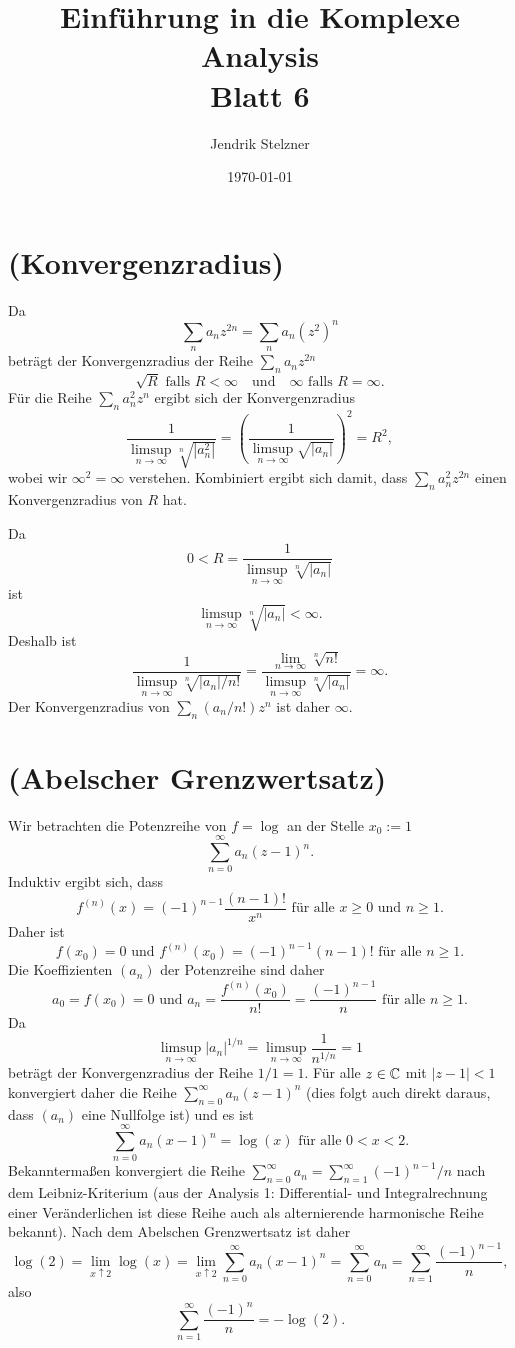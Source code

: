 \documentclass[a4paper,10pt]{article}
\title{\sc Einführung in die Komplexe Analysis \\ \Large Blatt 6}
\author{Jendrik Stelzner}
\date{\today}
\begin{document}
\maketitle





\section{(Konvergenzradius)}
Da
\[
 \sum_n a_n z^{2n}
 = \sum_n a_n \left(z^2\right)^n
\]
beträgt der Konvergenzradius der Reihe $\sum_n a_n z^{2n}$
\[
 \sqrt{R} \text{ falls } R < \infty \quad \text{und} \quad \infty \text{ falls } R = \infty.
\]
Für die Reihe $\sum_n a_n^2 z^n$ ergibt sich der Konvergenzradius
\[
 \frac{1}{\limsup_{n \to \infty} \sqrt[n]{|a_n^2|}}
 = \left( \frac{1}{\limsup_{n \to \infty} \sqrt{|a_n|}} \right)^2
 = R^2,
\]
wobei wir $\infty^2 = \infty$ verstehen. Kombiniert ergibt sich damit, dass $\sum_n a_n^2 z^{2n}$ einen Konvergenzradius von $R$ hat.

Da
\[
 0 < R = \frac{1}{\limsup_{n \to \infty} \sqrt[n]{|a_n|}}
\]
ist
\[
 \limsup_{n \to \infty} \sqrt[n]{|a_n|} < \infty.
\]
Deshalb ist
\[
 \frac{1}{\limsup_{n \to \infty} \sqrt[n]{|a_n|/n!}}
 = \frac{\lim_{n \to \infty} \sqrt[n]{n!}}{\limsup_{n \to \infty} \sqrt[n]{|a_n|}}
 = \infty.
\]
Der Konvergenzradius von $\sum_n (a_n/n!) z^n$ ist daher $\infty$.





\section{(Abelscher Grenzwertsatz)}
Wir betrachten die Potenzreihe von $f = \log$ an der Stelle $x_0 := 1$
\[
  \sum_{n=0}^\infty a_n (z-1)^n.
\]
Induktiv ergibt sich, dass
\[
 f^{(n)}(x) = (-1)^{n-1} \frac{(n-1)!}{x^n} \text{ für alle } x \geq 0 \text{ und } n \geq 1.
\]
Daher ist
\[
 f(x_0) = 0 \text{ und } f^{(n)}(x_0) = (-1)^{n-1}(n-1)! \text{ für alle } n \geq 1.
\]
Die Koeffizienten $(a_n)$ der Potenzreihe sind daher
\[
 a_0 = f(x_0) = 0 \text{ und } a_n = \frac{f^{(n)}(x_0)}{n!} = \frac{(-1)^{n-1}}{n} \text{ für alle } n \geq 1.
\]
Da
\[
 \limsup_{n \to \infty} |a_n|^{1/n} = \limsup_{n \to \infty} \frac{1}{n^{1/n}} = 1
\]
beträgt der Konvergenzradius der Reihe $1/1 = 1$. Für alle $z \in \mathbb{C}$ mit $|z-1| < 1$ konvergiert daher die Reihe $\sum_{n=0}^\infty a_n (z-1)^n$ (dies folgt auch direkt daraus, dass $(a_n)$ eine Nullfolge ist) und es ist
\[
 \sum_{n=0}^\infty a_n (x-1)^n = \log(x) \text{ für alle } 0 < x < 2.
\]
Bekanntermaßen konvergiert die Reihe $\sum_{n=0}^\infty a_n = \sum_{n=1}^\infty (-1)^{n-1}/n$ nach dem Leibniz-Kriterium (aus der Analysis 1: Differential- und Integralrechnung einer Veränderlichen ist diese Reihe auch als alternierende harmonische Reihe bekannt). Nach dem Abelschen Grenzwertsatz ist daher
\[
 \log(2)
 = \lim_{x \uparrow 2} \log(x)
 = \lim_{x \uparrow 2} \sum_{n=0}^\infty a_n (x-1)^n
 = \sum_{n=0}^\infty a_n
 = \sum_{n=1}^\infty \frac{(-1)^{n-1}}{n},
\]
also
\[
 \sum_{n=1}^\infty \frac{(-1)^n}{n} = -\log(2).
\]
\end{document}
